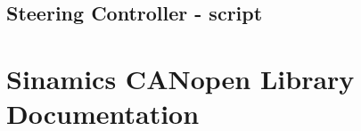\section{Steering Controller - script}
\label{appendix:steering_code}
\lstset{language=Python}

\cleardoublepage

\setcounter{page}{1}
\pagestyle{empty}
\setlength{\voffset}{\originalVOffset}
\setlength{\hoffset}{\originalHOffset}
\chapter{Sinamics CANopen Library Documentation}
\cleardoublepage
\setlength{\voffset}{0cm}
\setlength{\hoffset}{0cm}
\label{appendix:sinamics}

\setlength{\voffset}{\originalVOffset}
\setlength{\hoffset}{\originalHOffset}
\cleardoublepage